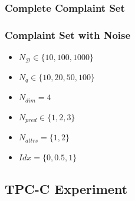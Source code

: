 \subsubsection{Complete Complaint Set}

\subsubsection{Complaint Set with Noise}

\begin{itemize}
\item $N_\mathcal{D} \in \{10, 100, 1000\}$
\item $N_q \in \{10, 20, 50, 100\}$
\item $N_{dim} = 4$
\item $N_{pred} \in \{1, 2, 3\}$
\item $N_{attrs} = \{1, 2\}$
\item $Idx = \{0, 0.5, 1\}$
\end{itemize}

\subsection{TPC-C Experiment}


